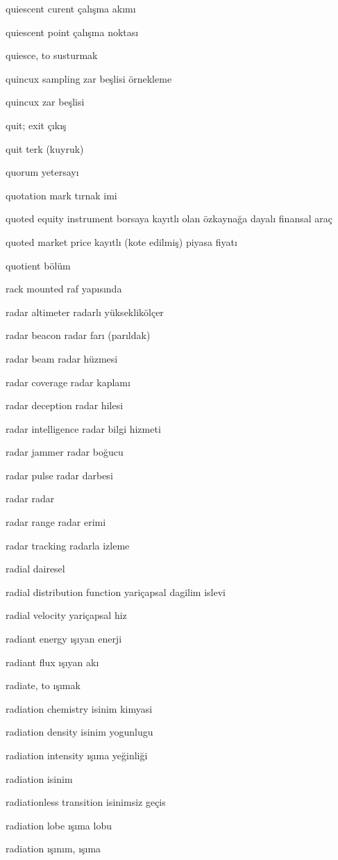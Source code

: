 \documentclass[12pt,fleqn]{article}\usepackage{../../common}
\begin{document}
quiescent curent çalışma akımı

quiescent point çalışma noktası

quiesce, to susturmak

quincux sampling zar beşlisi örnekleme

quincux zar beşlisi

quit; exit çıkış

quit terk (kuyruk)

quorum yetersayı

quotation mark tırnak imi

quoted equity instrument borsaya kayıtlı olan özkaynağa dayalı finansal araç

quoted market price kayıtlı (kote edilmiş) piyasa fiyatı

quotient bölüm

rack mounted raf yapısında

radar altimeter radarlı yükseklikölçer

radar beacon radar farı (parıldak)

radar beam radar hüzmesi

radar coverage radar kaplamı

radar deception radar hilesi

radar intelligence radar bilgi hizmeti

radar jammer radar boğucu

radar pulse radar darbesi

radar radar

radar range radar erimi

radar tracking radarla izleme

radial dairesel

radial distribution function yariçapsal dagilim islevi

radial velocity yariçapsal hiz

radiant energy ışıyan enerji

radiant flux ışıyan akı

radiate, to ışımak

radiation chemistry isinim kimyasi

radiation density isinim yogunlugu

radiation intensity ışıma yeğinliği

radiation isinim

radiationless transition isinimsiz geçis

radiation lobe ışıma lobu

radiation ışınım, ışıma
\end{document}
